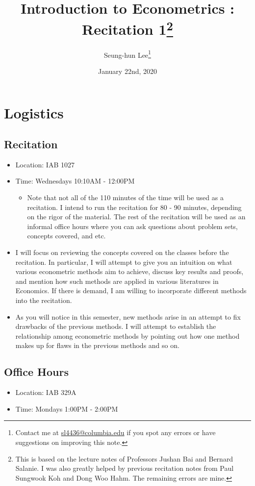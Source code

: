 \documentclass[12pt]{article}
\title{Introduction to Econometrics \ROM{2}: Recitation 1\footnote{This is based on the lecture notes of Professors Jushan Bai and Bernard Salanie. I was also greatly helped by previous recitation notes from Paul Sungwook Koh and Dong Woo Hahm. The remaining errors are mine. }}
\theoremstyle{definition}
\theoremstyle{property}
\theoremstyle{example}
\begin{document}
\linespread{1.25}
\onehalfspacing

\author{Seung-hun Lee\footnote{Contact me at \href{mailto:sl4436@columbia.edu}{sl4436@columbia.edu} if you spot any errors or have suggestions on improving this note.}}
\date{January 22nd, 2020}
\maketitle
\thispagestyle{firstpage}

\section{Logistics}
\subsection{Recitation}
\begin{itemize}
\item Location: IAB 1027
\item Time: Wednesdays 10:10AM - 12:00PM 
\begin{itemize}
\item Note that not all of the 110 minutes of the time will be used as a recitation. I intend to run the recitation for 80 - 90 minutes, depending on the rigor of the material. The rest of the recitation will be used as an informal office hours where you can ask questions about problem sets, concepts covered, and etc.  
\end{itemize}
\item I will focus on reviewing the concepts covered on the classes before the recitation. In particular, I will attempt to give you an intuition on what various econometric methods aim to achieve, discuss key results and proofs, and mention how such methods are applied in various literatures in Economics. If there is demand, I am willing to incorporate different methods into the recitation. 
\item As you will notice in this semester, new methods arise in an attempt to fix drawbacks of the previous methods. I will attempt to establish the relationship among econometric methods by pointing out how one method makes up for flaws in the previous methods and so on. 
\end{itemize}
\subsection{Office Hours}
\begin{itemize}
\item Location: IAB 329A
\item Time: Mondays 1:00PM - 2:00PM
\end{itemize}
\end{document}
